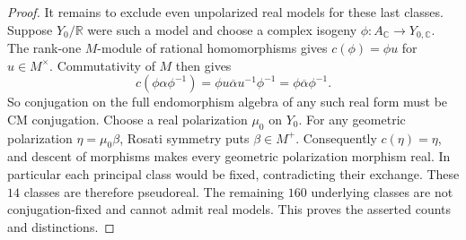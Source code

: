 \begin{proof}
It remains to exclude even unpolarized real models for these last
classes. Suppose $Y_0/\mathbb R$ were such a model and choose a complex
isogeny $\phi:A_{\mathbb C}\longrightarrow Y_{0,\mathbb C}$.
The rank-one $M$-module of rational homomorphisms gives
$c(\phi)=\phi u$ for $u\in M^\times$. Commutativity of $M$ then gives
\[
 c(\phi\alpha\phi^{-1})
   =\phi u\overline\alpha u^{-1}\phi^{-1}
   =\phi\overline\alpha\phi^{-1}.
\]
So conjugation on the full endomorphism algebra of any such real form
must be CM conjugation. Choose a real polarization $\mu_0$ on $Y_0$.
For any geometric polarization $\eta=\mu_0\beta$, Rosati symmetry
puts $\beta\in M^+$. Consequently $c(\eta)=\eta$, and descent of
morphisms makes every geometric polarization morphism real.
In particular each principal class would be fixed, contradicting their
exchange. These $14$ classes are therefore pseudoreal. The remaining
$160$ underlying classes are not conjugation-fixed and cannot admit real
models. This proves the asserted counts and distinctions.
\end{proof}

